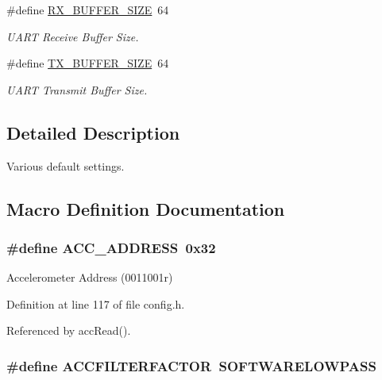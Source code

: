 \begin{DoxyCompactItemize}
\#define \hyperlink{group__config_ga739a2a1a0047c98ac1b18ecd25dac092}{R\-X\-\_\-\-B\-U\-F\-F\-E\-R\-\_\-\-S\-I\-Z\-E}~64
\begin{DoxyCompactList}\small\item\em U\-A\-R\-T Receive Buffer Size. \end{DoxyCompactList}\item 
\#define \hyperlink{group__config_ga9ab33647617098646990fe263600b650}{T\-X\-\_\-\-B\-U\-F\-F\-E\-R\-\_\-\-S\-I\-Z\-E}~64
\begin{DoxyCompactList}\small\item\em U\-A\-R\-T Transmit Buffer Size. \end{DoxyCompactList}\end{DoxyCompactItemize}


\subsection{Detailed Description}
Various default settings. 

\subsection{Macro Definition Documentation}
\hypertarget{group__config_ga27341a8e1cb1a6ace5a5cf3caea1c99f}{
\subsubsection[{A\-C\-C\-\_\-\-A\-D\-D\-R\-E\-S\-S}]{\setlength{\rightskip}{0pt plus 5cm}\#define A\-C\-C\-\_\-\-A\-D\-D\-R\-E\-S\-S~0x32}}\label{group__config_ga27341a8e1cb1a6ace5a5cf3caea1c99f}


Accelerometer Address (0011001r) 



Definition at line 117 of file config.\-h.



Referenced by acc\-Read().

\hypertarget{group__config_gaace41596724b03f3f2b2ee28b7e87272}{
\subsubsection[{A\-C\-C\-F\-I\-L\-T\-E\-R\-F\-A\-C\-T\-O\-R}]{\setlength{\rightskip}{0pt plus 5cm}\#define A\-C\-C\-F\-I\-L\-T\-E\-R\-F\-A\-C\-T\-O\-R~{\bf S\-O\-F\-T\-W\-A\-R\-E\-L\-O\-W\-P\-A\-S\-S}}}\label{group__config_gaace41596724b03f3f2b2ee28b7e87272}


